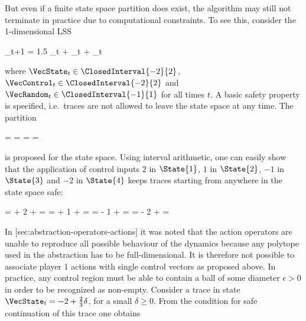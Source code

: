     But even if a finite state space partition does exist, the algorithm may still not terminate in practice due to computational constraints.
    To see this, consider the 1-dimensional LSS

    \startformula
        \VecState_{t+1} = 1.5 \cdot \VecState_t + \VecControl_t + \VecRandom_t \EndComma
    \stopformula

    where $\VecState_t \in \ClosedInterval{-2}{2}$, $\VecControl_t \in \ClosedInterval{-2}{2}$ and $\VecRandom_t \in \ClosedInterval{-1}{1}$ for all times $t$.
    A basic safety property is specified, i.e.\ traces are not allowed to leave the state space at any time.
    The partition

    \startformula
         =  \MidComma {} =  \MidComma {} =  \MidComma {} = 
    \stopformula

    is proposed for the state space.
    Using interval arithmetic, one can easily show that the application of control inputs $2$ in $\State{1}$, $1$ in $\State{2}$, $-1$ in $\State{3}$ and $-2$ in $\State{4}$ keeps traces starting from anywhere in the state space safe:

    \startformula
        \startalign[n=4,align={right,middle,left,left}]
            \NC {} =
             \cdot {} + 2 + 
            \NC = 
            \NC \subseteq \StateSpace \EndComma
            \NR
            \NC {} =
             \cdot {} + 1 + 
            \NC = 
            \NC \subseteq \StateSpace \EndComma
            \NR
            \NC {} =
             \cdot {} - 1 + 
            \NC = 
            \NC \subseteq \StateSpace \EndComma
            \NR
            \NC {} =
             \cdot {} - 2 + 
            \NC = 
            \NC \subseteq \StateSpace \EndPeriod
            \NR
        \stopalign
    \stopformula

    In [sec:abstraction-operators-actions] it was noted that the action operators are unable to reproduce all possible behaviour of the dynamics because any polytope used in the abstraction has to be full-dimensional.
    It is therefore not possible to associate player 1 actions with single control vectors as proposed above.
    In practice, any control region must be able to contain a ball of some diameter $\epsilon > 0$ in order to be recognized as non-empty.
    Consider a trace in state $\VecState_t = -2 + \frac{2}{3} \delta$, for a small $\delta \ge 0$.
    From the condition for safe continuation of this trace one obtains

